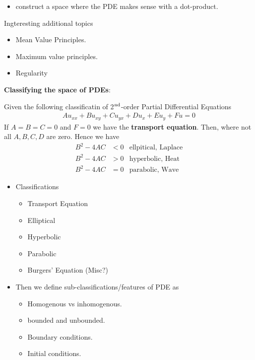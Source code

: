 \documentclass[12pt,a4paper]{report}
\begin{document}
{\begin{description}
\begin{itemize}
	Identity of derivative.
	
	Convolution Rule. $\widehat{f*g} = \hat{f}\hat{g}$
	
	Don't expect much of this but check out the type of question on test 2.

		\item construct a space where the PDE makes sense with a dot-product.
	\end{itemize}		
	
	Ingteresting additional topics
	\begin{itemize}
		\item Mean Value Principles.
		\item Maximum value principles.
		\item Regularity
	\end{itemize}
	
	\textbf{Classifying the space of PDEs}:

Given the following classificatin of 2$\textsuperscript{nd}$-order Partial Differential Equations
\begin{align*}
	Au_{xx}+Bu_{xy}+Cu_{yx}+Du_{x}+Eu_y+Fu=0
	\end{align*}If $A=B=C=0$ and $F=0$ we have the \textbf{transport equation}.  Then, where not all $A,B,C,D$ are zero.  Hence we have
\begin{align*}
	B^2-4AC &<0 & \text{ellpitical, Laplace} \\
	B^2-4AC &>0 & \text{hyperbolic, Heat} \\
	B^2-4AC &=0 & \text{parabolic, Wave} 
\end{align*}

\begin{itemize}

\item Classifications
\begin{itemize}
	\item Transport Equation
	\item Elliptical
	\item Hyperbolic
	\item Parabolic
	\item Burgers' Equation (Misc?)
\end{itemize}

\item Then we define sub-classifications/features of PDE as
\begin{itemize}
	\item Homogenous vs inhomogenous.
	\item bounded and unbounded.
	\item Boundary conditions.
	\item Initial conditions.
\end{itemize}


\end{itemize}
\end{description}}
\end{document}

